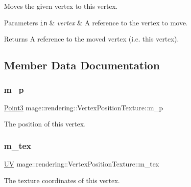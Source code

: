 Moves the given vertex to this vertex.


\begin{DoxyParams}[1]{Parameters}
\mbox{\tt in}  & {\em vertex} & A reference to the vertex to move. \\
\hline
\end{DoxyParams}
\begin{DoxyReturn}{Returns}
A reference to the moved vertex (i.\+e. this vertex). 
\end{DoxyReturn}


\subsection{Member Data Documentation}
\hypertarget{structmage_1_1rendering_1_1_vertex_position_texture_ae296d14afcc5b58ee99a1575d87f1e0f}{}\label{structmage_1_1rendering_1_1_vertex_position_texture_ae296d14afcc5b58ee99a1575d87f1e0f} 
\subsubsection{\texorpdfstring{m\+\_\+p}{m\_p}}
{\footnotesize\ttfamily \hyperlink{structmage_1_1_point3}{Point3} mage\+::rendering\+::\+Vertex\+Position\+Texture\+::m\+\_\+p}

The position of this vertex. \hypertarget{structmage_1_1rendering_1_1_vertex_position_texture_a958b1fdb6353ebc269606b9fcd8ab3d3}{}\label{structmage_1_1rendering_1_1_vertex_position_texture_a958b1fdb6353ebc269606b9fcd8ab3d3} 
\subsubsection{\texorpdfstring{m\+\_\+tex}{m\_tex}}
{\footnotesize\ttfamily \hyperlink{structmage_1_1_u_v}{UV} mage\+::rendering\+::\+Vertex\+Position\+Texture\+::m\+\_\+tex}

The texture coordinates of this vertex. \hypertarget{structmage_1_1rendering_1_1_vertex_position_texture_ade58ac70fb8177765cb73ba463acdd75}{}\label{structmage_1_1rendering_1_1_vertex_position_texture_ade58ac70fb8177765cb73ba463acdd75} 
